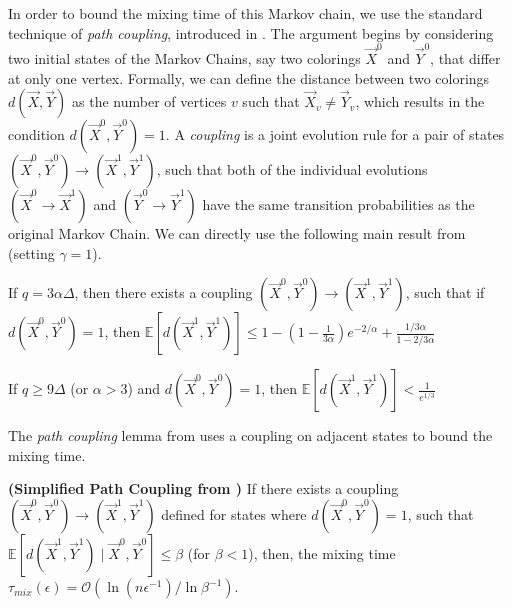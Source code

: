 In order to bound the mixing time of this Markov chain, we use the standard technique of \emph{path coupling}, introduced in \cite{path_coupling}.
The argument begins by considering two initial states of the Markov Chains, say two colorings $\vec X^0$ and $\vec Y^0$,
that differ at only one vertex.
Formally, we can define the distance between two colorings $d(\vec X,\vec Y)$ as the number of vertices $v$ such that $\vec X_v\not= \vec Y_v$,
which results in the condition $d(\vec X^0, \vec Y^0) = 1$.
A \emph{coupling} is a joint evolution rule for a pair of states $(\vec X^0,\vec Y^0)\rightarrow(\vec X^1,\vec Y^1)$,
such that both of the individual evolutions $(\vec X^0\rightarrow \vec X^1)$ and $(\vec Y^0\rightarrow \vec Y^1)$
have the same transition probabilities as the original Markov Chain.
We can directly use the following main result from \cite{ghaffari_fischer} (setting $\gamma = 1$).
\begin{lemma}
\label{lem:ghaffari_fischer_single_epoch_distance}
If $q = 3\alpha\Delta$, then there exists a coupling $(\vec X^0,\vec Y^0)\rightarrow(\vec X^1,\vec Y^1)$, such that if $d(\vec X^0, \vec Y^0) = 1$,
then $\mathbb E[d(\vec X^1,\vec Y^1)] \le 1-\left( 1-\frac1{3\alpha}\right)e^{-2/\alpha} + \frac{1/3\alpha}{1-2/3\alpha}$
\end{lemma}
\begin{corollary}
\label{cor:single_epoch_distansce}
If $q \ge 9\Delta$ (or $\alpha > 3$) and $d(\vec X^0, \vec Y^0) = 1$, then $\mathbb E[d(\vec X^1,\vec Y^1)] < \frac1{e^{1/3}}$
\end{corollary}

The \emph{path coupling} lemma from \cite{path_coupling} uses a coupling on adjacent states to bound the mixing time.
\begin{lemma}
\label{lem:path_coupling}
\textbf{(Simplified Path Coupling from \cite{path_coupling})}
If there exists a coupling $(\vec X^0,\vec Y^0)\rightarrow(\vec X^1,\vec Y^1)$ defined for states where $d(\vec X^0, \vec Y^0) = 1$,
such that $\mathbb{E}[d(\vec X^1, \vec Y^1) \mid \vec X^0, \vec Y^0] \le \beta$ (for $\beta < 1$),
then, the mixing time $\tau_{mix}(\epsilon) = \mathcal O(\ln (n\epsilon^{-1})/\ln \beta^{-1})$.
\end{lemma}

